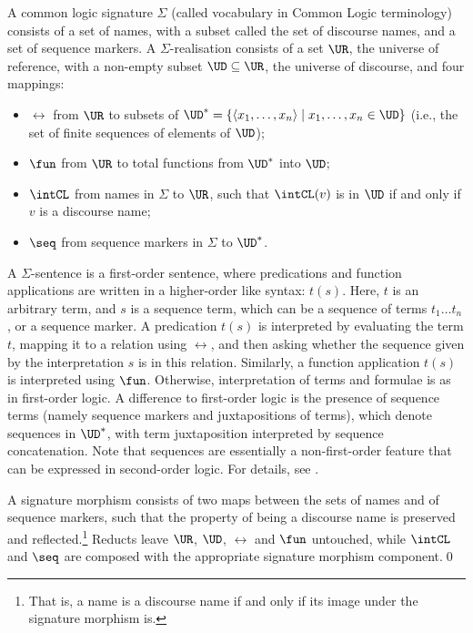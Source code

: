 \documentclass[10pt, a4paper]{isov2}
\begin{document}
\begin{definition}\label{sem:CommonLogic}
A common logic signature
$\Sigma$ (called vocabulary in Common Logic terminology) consists of a
set of names, with a subset called the set of discourse names, and a
set of sequence markers.
A $\Sigma$-realisation consists of a set $\UR$,
the universe of reference, with a non-empty subset $\UD\subseteq \UR$,
the universe of discourse, and four mappings:
  \begin{itemize}
   \item $\rel$ from $\UR$ to subsets of $\UD^* = \{\langle x_1,\ldots,x_n \rangle \mid x_1,\ldots,x_n \in \UD\}$ (i.e., the set of finite sequences of
elements of $\UD$);
   \item $\fun$ from $\UR$ to total functions from $\UD^*$ into $\UD$;
   \item $\intCL$ from names in $\Sigma$ to $\UR$, such that
$\intCL(v)$ is in $\UD$ if and only if $v$ is a discourse name;
   \item $\seq$ from sequence markers in $\Sigma$ to $\UD^*$.
  \end{itemize}  A $\Sigma$-sentence is a first-order
sentence, where predications and function applications are written
in a higher-order like syntax: $t(s)$.
Here, $t$ is an arbitrary term, and $s$ is a sequence term, which can
be a sequence of terms $t_1\ldots t_n$, or a sequence marker.
A predication $t(s)$ is interpreted by evaluating the term $t$,
mapping it to a relation using $\rel$, and then asking whether the sequence
given by the interpretation $s$ is in this relation.  
Similarly, a function application $t(s)$ is interpreted using $\fun$.
Otherwise, interpretation of terms and formulae is as in
first-order logic. 
A 
difference to first-order logic is the presence of sequence terms (namely sequence markers and
juxtapositions of terms), which denote sequences in $\UD^*$, with term
juxtaposition interpreted by sequence concatenation.
Note that sequences are essentially a non-first-order feature that
can be expressed in second-order logic.
For details, see \cite{CommonLogic:oldfashioned}.

A \Clogic signature morphism 
consists of two maps between the sets of names and of sequence markers, such that the property of 
being a discourse name is preserved and reflected.\footnote{That  is, a name is a discourse
name if and only if its image under the signature morphism is.}
  Reducts leave $\UR$, $\UD$, 
$\rel$ and $\fun$ untouched, while $\intCL$ and $\seq$ are composed with the appropriate
signature morphism component.\quad\qed
\end{definition}
%
\end{document}
